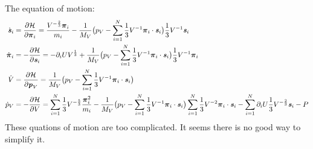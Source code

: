 \documentclass[aps, pre, preprint,unsortedaddress,a4paper,onecolumn]{revtex4}
\newcommand{\vect}[1]{\textbf{\textit{#1}}}
\newcommand{\mypi}{\boldsymbol\pi}
\begin{document}
The equation of motion:
\begin{align}
  \dot{\vect s}_i
  &=
  \frac{\partial \mathcal H}{\partial \mypi_i}
  =
  \frac{V^{-\frac23}\mypi_i}{m_i} -
  \frac1{{M_V}}\big(p_V - \sum_{i=1}^N\frac13V^{-1} \mypi_i\cdot\vect s_i\big)\frac13 V^{-1}\vect s_i \\
  \dot{\mypi}_i
  &= 
  -\frac{\partial \mathcal H}{\partial \vect s_i}
  = -\partial_i U V^{\frac13} +
  \frac1{{M_V}}\big(p_V - \sum_{i=1}^N\frac13V^{-1} \mypi_i\cdot\vect s_i\big)\frac13 V^{-1}\mypi_i \\
  \dot{V} 
  &=
  \frac{\partial \mathcal H}{\partial \vect p_V}
  =\frac1{M_V}\big(p_V - \sum_{i=1}^N\frac13V^{-1} \mypi_i\cdot\vect s_i\big)\\
  \dot{p}_V
  &=
  -\frac{\partial \mathcal H}{\partial V}
  =
  \sum_{i=1}^N \frac13V^{-\frac53} \frac{ \mypi_i^2}{m_i}
  -
  \frac1{{M_V}}\big(p_V - \sum_{i=1}^N\frac13V^{-1} \mypi_i\cdot\vect s_i\big)
  \sum_{i=1}^N\frac13V^{-2} \mypi_i\cdot\vect s_i
  -
  \sum_{i=1}^N\partial_i U \frac13V^{-\frac23}\vect s_i - P
\end{align}
These quations of motion are too complicated.  It seems there is no good way to simplify it.
\end{document}
